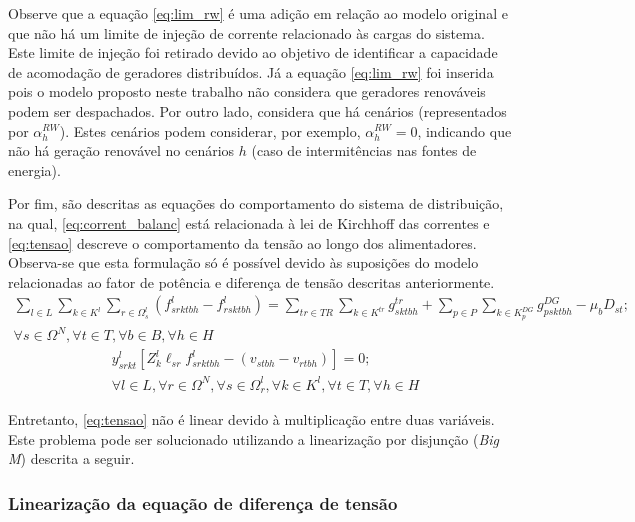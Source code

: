 Observe que a equação \eqref{eq:lim_rw} é uma adição em relação ao modelo original e que não há um limite de injeção de corrente relacionado às cargas do sistema. Este limite de injeção foi retirado devido ao objetivo de identificar a capacidade de acomodação de geradores distribuídos. Já a equação \eqref{eq:lim_rw} foi inserida pois o modelo proposto neste trabalho não considera que geradores renováveis podem ser despachados. Por outro lado, considera que há cenários (representados por $\alpha^{RW}_h$). Estes cenários podem considerar, por exemplo, $\alpha^{RW}_h = 0$, indicando que não há geração renovável no cenários $h$ (caso de intermitências nas fontes de energia).

Por fim, são descritas as equações do comportamento do sistema de distribuição, na qual, \eqref{eq:corrent_balanc} está relacionada à lei de Kirchhoff das correntes e \eqref{eq:tensao} descreve o comportamento da tensão ao longo dos alimentadores. Observa-se que esta formulação só é possível devido às suposições do modelo relacionadas ao fator de potência e diferença de tensão descritas anteriormente.
\begin{align}
    \sum_{l \in L}\sum_{k \in K^{l}} \sum_{r \in \Omega^l_s} (f^{l}_{srktbh} - f^{l}_{rsktbh}) =
    \sum_{tr \in TR} \sum_{k \in K^{tr}} g^{tr}_{sktbh} + \sum_{p\in P} \sum_{k \in K^{DG}_p} g^{DG}_{psktbh} - \mu_bD_{st};  \nonumber\\
    \forall s \in \Omega^N, \forall t \in T, \forall b \in B, \forall h \in H
    \label{eq:corrent_balanc}
\end{align}
\begin{align}
&y^l_{srkt}[Z^l_{k}\ell_{sr}f^l_{srktbh} - (v_{stbh} - v_{rtbh})] = 0; \nonumber\\
&\forall l \in L, \forall r \in \Omega^N, \forall s \in \Omega^{l}_r, \forall k \in K^{l}, \forall t \in T, \forall h \in H
\label{eq:tensao}
\end{align}

Entretanto, \eqref{eq:tensao} não é linear devido à multiplicação entre duas variáveis. Este problema pode ser solucionado utilizando a linearização por disjunção (\textit{Big M}) descrita a seguir.

\subsubsection*{Linearização da equação de diferença de tensão}

